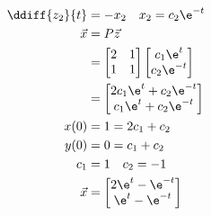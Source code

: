 \documentclass{math}
\begin{document}
\begin{align*}
  \ddiff{z_2}{t} &= -x_2 \quad x_2 = c_2\e^{-t} \\
  \vec{x} &= P\vec{z} \\
  &= \begin{bmatrix}2 & 1 \\ 1 & 1\end{bmatrix}\begin{bmatrix}
    c_1\e^t \\ c_2\e^{-t}
  \end{bmatrix} \\
  &= \begin{bmatrix}
    2c_1\e^t+c_2\e^{-t} \\ c_1\e^t+c_2\e^{-t}
  \end{bmatrix} \\
  x(0) &= 1 = 2c_1+c_2 \\
  y(0) &= 0 = c_1+c_2 \\
  c_1 &= 1 \quad c_2 = -1 \\
  \vec{x} &= \begin{bmatrix}
    2\e^t-\e^{-t} \\
    \e^t-\e^{-t}
  \end{bmatrix}
\end{align*}
\end{document}
